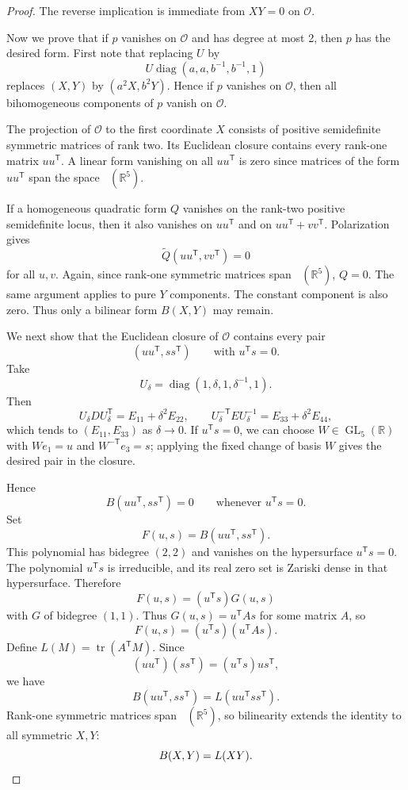 \documentclass[10pt,a4paper]{amsart}
\DeclareMathOperator{\GL}{GL}
\DeclareMathOperator{\Sym}{\mathsf{S}^2}
\DeclareMathOperator{\diag}{diag}
\newcommand{\tp}{{\scriptscriptstyle\mathsf{T}}}
\DeclareMathOperator{\tr}{tr}
\begin{document}
\begin{proof}
The reverse implication is immediate from $XY=0$ on $\mathcal O$.

Now we prove that if $p$ vanishes on $\mathcal O$ and has degree at most 2, then $p$ has the desired form. First note that replacing $U$ by
\[
U\diag(a,a,b^{-1},b^{-1},1)
\]
replaces $(X,Y)$ by $(a^2X,b^2Y)$. Hence if $p$ vanishes on $\mathcal O$, then all bihomogeneous components of $p$ vanish on $\mathcal O$.

The projection of $\mathcal O$ to the first coordinate $X$ consists of positive semidefinite symmetric matrices of rank two. Its Euclidean closure contains every rank-one matrix $uu^\tp $. A linear form vanishing on all $uu^\tp $ is zero since matrices of the form $uu^\tp $ span the space $\Sym(\mathbb{R}^5)$.

If a homogeneous quadratic form $Q$ vanishes on the rank-two positive semidefinite locus, then it also vanishes on $uu^\tp $ and on $uu^\tp +vv^\tp $. Polarization gives
\[
\widetilde Q(uu^\tp ,vv^\tp )=0
\]
for all $u,v$. Again, since rank-one symmetric matrices span $\Sym(\mathbb{R}^5)$, $Q=0$. The same argument applies to pure $Y$ components. The constant component is also zero. Thus only a bilinear form $B(X,Y)$ may remain.

We next show that the Euclidean closure of $\mathcal O$ contains every pair
\[
(uu^\tp ,ss^\tp )\qquad\text{with }u^\tp s=0.
\]
Take
\[
U_\delta=\diag(1,\delta,1,\delta^{-1},1).
\]
Then
\[
U_\delta DU_\delta^\tp =E_{11}+\delta^2E_{22},
\qquad
U_\delta^{-\tp} EU_\delta^{-1}=E_{33}+\delta^2E_{44},
\]
which tends to $(E_{11},E_{33})$ as $\delta \to 0$. If $u^\tp s=0$, we can choose $W\in\GL_5(\mathbb R)$ with $We_1=u$ and $W^{-\tp} e_3=s$; applying the fixed change of basis $W$ gives the desired pair in the closure.

Hence
\[
B(uu^\tp ,ss^\tp )=0\qquad\text{whenever }u^\tp s=0.
\]
Set
\[
F(u,s)=B(uu^\tp ,ss^\tp ).
\]
This polynomial has bidegree $(2,2)$ and vanishes on the hypersurface $u^\tp s=0$. The polynomial $u^\tp s$ is irreducible, and its real zero set is Zariski dense in that hypersurface. Therefore
\[
F(u,s)=(u^\tp s)G(u,s)
\]
with $G$ of bidegree $(1,1)$. Thus $G(u,s)=u^\tp As$ for some matrix $A$, so
\[
F(u,s)=(u^\tp s)(u^\tp As).
\]
Define $L(M)=\tr(A^\tp M)$. Since
\[
(uu^\tp )(ss^\tp )=(u^\tp s)us^\tp ,
\]
we have
\[
B(uu^\tp ,ss^\tp )=L(uu^\tp ss^\tp ).
\]
Rank-one symmetric matrices span $\Sym(\mathbb{R}^5)$, so bilinearity extends the identity to all symmetric $X,Y$:
\[
B(X,Y)=L(XY). \qedhere
\]
\end{proof}
\end{document}
